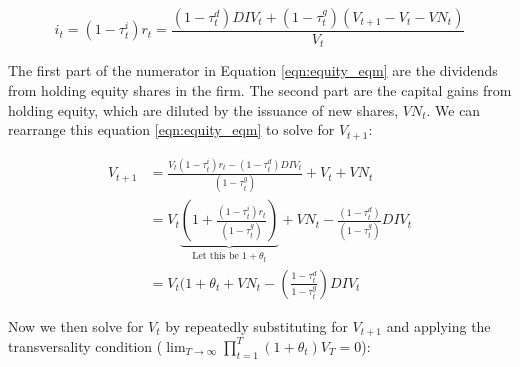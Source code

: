 \begin{equation}
\label{eqn:equity_eqm}
i_{t}=(1-\tau^{i}_{t})r_{t}=\frac{(1-\tau^{d}_{t})DIV_{t}+(1-\tau^{g}_{t})(V_{t+1}-V_{t}-VN_{t})}{V_{t}}
\end{equation}

The first part of the numerator in Equation \ref{eqn:equity_eqm} are the dividends from holding equity shares in the firm.  The second part are the capital gains from holding equity, which are diluted by the issuance of new shares, $VN_{t}$.  We can rearrange this equation \ref{eqn:equity_eqm} to solve for $V_{t+1}$:

\begin{equation}
\label{eqn:v_t1}
\begin{split}
V_{t+1}&=\frac{V_{t}(1-\tau^{i}_{t})r_{t}-(1-\tau^{d}_{t})DIV_{t}}{(1-\tau^{g}_{t})}+V_{t}+VN_{t} \\
 & = V_{t}\underbrace{\left(1+\frac{(1-\tau^{i}_{t})r_{t}}{(1-\tau^{g}_{t})}\right)}_{\text{Let this be }1+\theta_{t}} + VN_{t} - \frac{(1-\tau^{d}_{t})}{(1-\tau^{g}_{t})}DIV_{t} \\
 & = V_{t}(1+\theta_{t} + VN_{t} - \left(\frac{1-\tau^{d}_{t}}{1-\tau^{g}_{t}}\right)DIV_{t}
\end{split}
\end{equation}

\noindent\noindent Now we then solve for $V_{t}$ by repeatedly substituting for $V_{t+1}$ and applying the transversality condition ($\lim_{T \to \infty} \prod_{t=1}^{T}(1+\theta_{t})V_{T}=0$):

